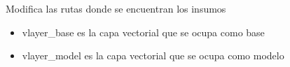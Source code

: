 \documentclass[letterpaper,10pt,spanish]{sphinxmanual}
\begin{document}
Modifica las rutas donde se encuentran los insumos
\begin{itemize}
\item {} 
vlayer\_base es la capa vectorial que se ocupa como base

\item {} 
vlayer\_model es la capa vectorial que se ocupa como modelo

\end{itemize}

\noindent{}
\label{\detokenize{leesallee:module-indice_lee_sallee}}
\end{document}
